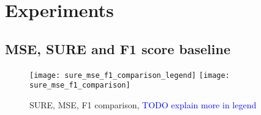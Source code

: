 
\section{Experiments}
\label{sec:experiments}









\subsection{MSE, SURE and F1 score baseline}

\begin{figure}[h]
    \centering
    \texttt{[image: sure\_mse\_f1\_comparison\_legend]}
    \texttt{[image: sure\_mse\_f1\_comparison]}
    \caption{SURE, MSE, F1 comparison, \textcolor{blue}{TODO explain more in legend}}
    \label{fig:sure_mse_f1_comparison}
\end{figure}
